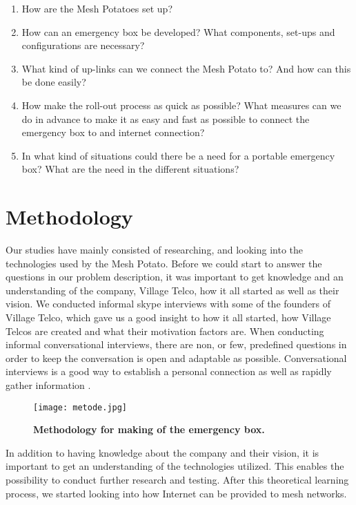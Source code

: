 \begin{enumerate}
\item How are the Mesh Potatoes set up? 
\item How can an emergency box be developed? What components, set-ups and configurations are necessary?
\item What kind of up-links can we connect the Mesh Potato to? And how can this be done easily? 
\item How make the roll-out process as quick as possible? What measures can we do in advance to make it as easy and fast as possible to connect the emergency box to and internet connection?
\item In what kind of situations could there be a need for a portable emergency box? What are the need in the different situations?
\end{enumerate}


\section{Methodology}

Our studies have mainly consisted of researching, and looking into the technologies used by the Mesh Potato. Before we could start to answer the questions in our problem description, it was important to get knowledge and an understanding of the company, Village Telco, how it all started as well as their vision. We conducted informal skype interviews with some of the founders of Village Telco, which gave us a good insight to how it all started, how Village Telcos are created and what their motivation factors are. When conducting informal conversational interviews, there are non, or few, predefined questions in order to keep the conversation is open and adaptable as possible. Conversational interviews is a good way to establish a personal connection as well as rapidly gather information  \cite{interview}. 

\begin{figure}[b]
  \centering
      \texttt{[image: metode.jpg]}
  \caption [Methodology for making of the emergency box]{\textbf{Methodology for making of the emergency box.}}
  \label{fig:metode}
\end{figure}


In addition to having knowledge about the company and their vision, it is important to get an understanding of the technologies utilized. This enables the possibility to conduct further research and testing. After this theoretical learning process, we started looking into how Internet can be provided to mesh networks. 

